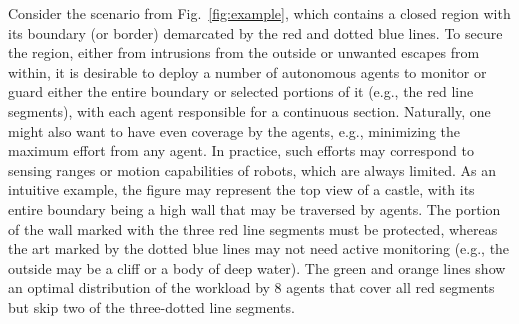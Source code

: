 

\def\R{\mathcal R}
\def\C{\mathcal C}
\def\S{\mathcal S}
\def\P{\mathcal P}
\def\G{\mathcal G}
\def\W{\mathcal W}
\def\opg{{\sc {OPG}}\xspace}

Consider the scenario from Fig.~\ref{fig:example}, which contains a closed region with its boundary (or border) demarcated by the red and dotted blue lines. To secure the region, either from intrusions from the outside or unwanted escapes from within, it is desirable to deploy a number of autonomous agents to monitor or guard either the entire boundary or selected portions of it (e.g., the red line segments), with each agent responsible for a continuous section. 
%
Naturally, one might also want to have even coverage by the agents, e.g., minimizing the maximum effort from any agent. In practice, such efforts may correspond to sensing ranges or motion capabilities of robots, which are always limited. 
%
As an intuitive example, the figure may represent the top view of a castle, with its entire boundary being a high wall that may be traversed by agents. 
%
The portion of the wall marked with the three red line segments must be protected, whereas the art marked by the dotted blue lines may not need active monitoring (e.g., the outside may be a cliff or a body of deep water). The green and orange lines show an optimal distribution of the workload by $8$ agents that cover all red segments but skip two of the three-dotted line segments. 

